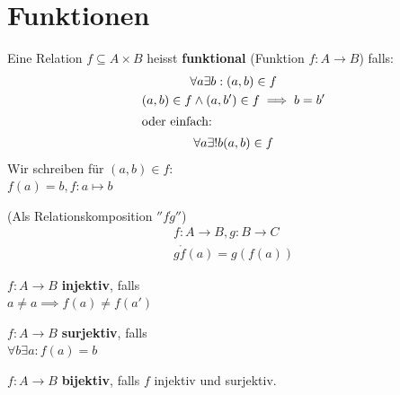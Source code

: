 \section{Funktionen}
\begin{def*}[note = Funktion , index = Funktion]
	Eine Relation $f \subseteq A \times B$ heisst \textbf{funktional} (Funktion $f: A \rightarrow B$) falls:
	\begin{gather*}
		\forall a \exists b : (a,b) \in f \\
		(a,b) \in f \wedge (a,b') \in f \implies b = b' \\
		\intertext{oder einfach:}
		\forall a \exists ! b (a,b) \in f
	\end{gather*}
	Wir schreiben für $(a,b) \in f$: \\
	$f( a ) = b , f: a \mapsto b$
\end{def*}
\begin{def*}[note = Komposition , index = Komposition]
	(Als Relationskomposition $''f \ring g''$) \\
	\begin{gather*}
		f: A \rightarrow B, g: B \rightarrow C \\
		g \ring f( a ) = g( f( a ))
	\end{gather*}
\end{def*}
\begin{def*}[note = Injektivität , index = Injektivität]
	$f: A \rightarrow B$ \textbf{injektiv}, falls \\
	$a \neq a \implies f( a ) \neq f( a' )$
\end{def*}
\begin{def*}[note = Surjektivität , index = Surjektivität]
	$f: A \rightarrow B$ \textbf{surjektiv}, falls \\
	$\forall b \exists a : f( a ) = b$
\end{def*}
\begin{def*}[note = Bijektivität , index = Bijektivität]
	$f: A \rightarrow B$ \textbf{bijektiv}, falls $f$ injektiv und surjektiv.
\end{def*}

